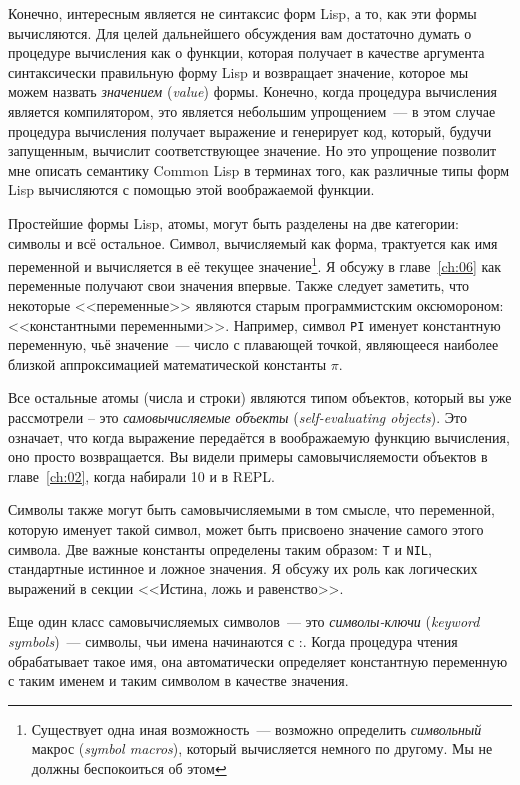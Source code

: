 Конечно, интересным является не синтаксис форм Lisp, а то, как эти формы вычисляются. Для
целей дальнейшего обсуждения вам достаточно думать о процедуре вычисления как о функции,
которая получает в качестве аргумента синтаксически правильную форму Lisp и возвращает
значение, которое мы можем назвать \textit{значением} (\textit{value}) формы. Конечно,
когда процедура вычисления является компилятором, это является небольшим упрощением~--- в
этом случае процедура вычисления получает выражение и генерирует код, который, будучи
запущенным, вычислит соответствующее значение. Но это упрощение позволит мне описать
семантику Common Lisp в терминах того, как различные типы форм Lisp вычисляются с помощью
этой воображаемой функции.

Простейшие формы Lisp, атомы, могут быть разделены на две категории: символы и всё
остальное. Символ, вычисляемый как форма, трактуется как имя переменной и вычисляется в её
текущее значение\footnote{Существует одна иная возможность~--- возможно определить
  \textit{символьный} макрос (\textit{symbol macros}), который вычисляется немного по
  другому. Мы не должны беспокоиться об этом}. Я обсужу в главе~\ref{ch:06} как переменные получают
свои значения впервые. Также следует заметить, что некоторые <<переменные>> являются старым
программистским оксюмороном: <<константными переменными>>. Например, символ \lstinline{PI}
именует константную переменную, чьё значение~--- число с плавающей точкой, являющееся
наиболее близкой аппроксимацией математической константы $\pi$.

Все остальные атомы (числа и строки) являются типом объектов, который вы уже рассмотрели
-- это \textit{самовычисляемые объекты} (\textit{self-evaluating objects}). Это означает,
что когда выражение передаётся в воображаемую функцию вычисления, оно просто
возвращается. Вы видели примеры самовычисляемости объектов в главе~\ref{ch:02}, когда набирали 10 и
 в REPL.

Символы также могут быть самовычисляемыми в том смысле, что переменной, которую именует
такой символ, может быть присвоено значение самого этого символа. Две важные константы
определены таким образом: \lstinline{T} и \lstinline{NIL}, стандартные истинное и ложное
значения. Я обсужу их роль как логических выражений в секции <<Истина, ложь и равенство>>.

Еще один класс самовычисляемых символов~--- это \textit{символы-ключи} (\textit{keyword
  symbols})~--- символы, чьи имена начинаются с :. Когда процедура чтения обрабатывает
такое имя, она автоматически определяет константную переменную с таким именем и таким
символом в качестве значения.

